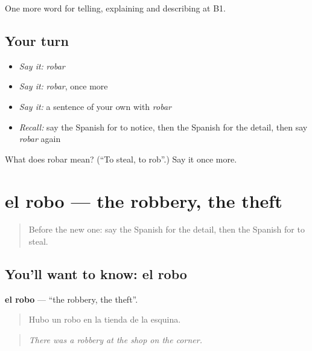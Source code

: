 \begin{grammarlens}[title={What you've built}]
One more word for telling, explaining and describing at B1.
\end{grammarlens}

\subsection*{Your turn}
\begin{itemize}
\raggedright
  \item \emph{Say it:} \emph{robar}
  \item \emph{Say it:} \emph{robar}, once more
  \item \emph{Say it:} a sentence of your own with \emph{robar}
  \item \emph{Recall:} say the Spanish for to notice, then the Spanish for the detail, then say \emph{robar} again
\end{itemize}

\begin{tcolorbox}[breakable,colback=teal!4,colframe=teal!35!black,title={Before you move on}]
What does robar mean? (\textquotedblleft{}To steal, to rob\textquotedblright{}.) Say it once more.
\end{tcolorbox}
\section[el robo]{el robo — the robbery, the theft}

\label{lesson:ES-C518-robo}



\begin{quote}
Before the new one: say the Spanish for the detail, then the Spanish for to steal.
\end{quote}

\subsection*{You'll want to know: el robo}
\textbf{el robo} — \textquotedblleft{}the robbery, the theft\textquotedblright{}.

\begin{quote}
Hubo un robo en la tienda de la esquina.
\end{quote}

\begin{quote}
\emph{There was a robbery at the shop on the corner.}
\end{quote}

